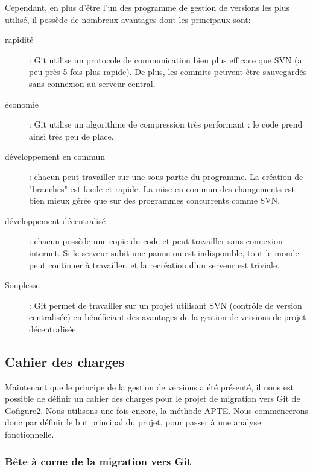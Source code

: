 Cependant, en plus d'être l'un des programme de gestion de versions les plus utilisé,
 il possède de nombreux avantages dont les principaux sont:
\begin{description}
  \item[rapidité] : Git utilise un protocole de communication bien plus efficace que SVN (a peu près 5 fois plus rapide). 
  De plus, les commits peuvent être sauvegardés sans connexion au serveur central.
  \item[économie] : Git utilise un algorithme de compression très performant : le code prend ainsi très peu de place.
  \item[développement en commun] : chacun peut travailler sur une sous partie du programme. La création de "branches" est facile et
  rapide. La mise en commun des changements est bien mieux gérée que sur des programmes concurrents comme SVN.
  \item[développement décentralisé] : chacun possède une copie du code et peut travailler sans connexion internet. 
  Si le serveur subit une panne ou est indisponible, tout le monde peut continuer à travailler, et la recréation d'un serveur est triviale.
  \item[Souplesse] : Git permet de travailler sur un projet utilisant SVN (contrôle de version centralisée)
  en bénéficiant des avantages de la gestion de versions de projet décentralisée.
\end{description}

\subsection{Cahier des charges}

Maintenant que le principe de la gestion de versions a été présenté,
il nous est possible de définir un cahier des charges
pour le projet de migration vers Git de Gofigure2.
Nous utilisons une fois encore, la méthode {APTE\textregistered}.
Nous commencerons donc par définir le but principal du projet, pour passer à une analyse fonctionnelle.

\subsubsection*{Bête à corne de la migration vers Git}


